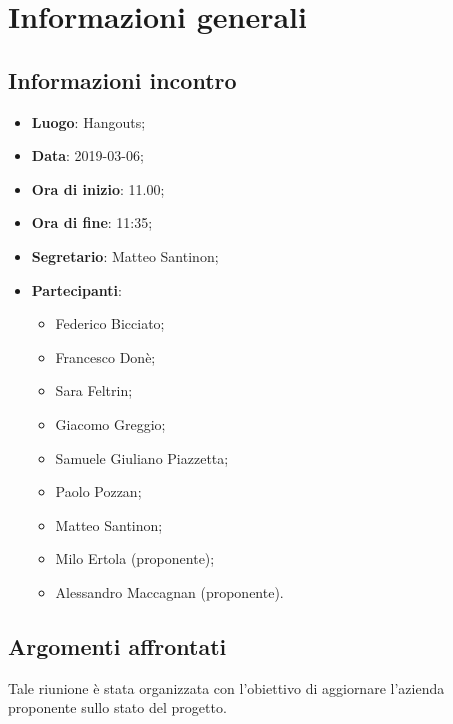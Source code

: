 \section{Informazioni generali}

\subsection{Informazioni incontro}
\begin{itemize}
\item \textbf{Luogo}: Hangouts;
\item \textbf{Data}: 2019-03-06;
\item \textbf{Ora di inizio}: 11.00;
\item \textbf{Ora di fine}: 11:35;
\item \textbf{Segretario}: Matteo Santinon;
\item \textbf{Partecipanti}: 
\begin{itemize}
	\item Federico Bicciato;
	\item Francesco Donè;
	\item Sara Feltrin;
	\item Giacomo Greggio;
	\item Samuele Giuliano Piazzetta;
	\item Paolo Pozzan;
	\item Matteo Santinon;
	\item Milo Ertola (proponente);
	\item Alessandro Maccagnan (proponente).
\end{itemize}
\end{itemize}

\subsection{Argomenti affrontati}
Tale riunione è stata organizzata con l'obiettivo di aggiornare l'azienda 
proponente sullo stato del progetto.

